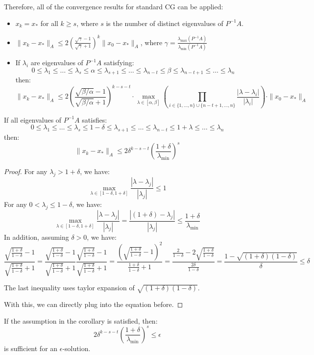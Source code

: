 \documentclass[../main/main.tex]{subfiles}
\begin{document}
                         Therefore, all of the convergence results for standard CG can be applied:
                         \begin{itemize}
            \item $x_{k}=x_{*}$ for all $k \geq  s$, where $s$ is the number of distinct eigenvalues of $P^{-1} A$.
    \item $\|x_{k}-x_{*}\|_{A} \leq  2 \left(\frac{\sqrt{\gamma }-1}{\sqrt{\gamma }+1} \right)^{ k  } \|x_{0}-x_{*}\|_{A}$, where $\gamma  = \frac{\lambda _{\max }(P^{-1} A)}{\lambda _{\min }(P^{-1} A)} $
                           \item If $\lambda _{i}$ are eigenvalues of $P^{-1} A$ satisfying: \[
                                 0 \leq  \lambda _{1} \leq  \ldots  \leq  \lambda _{s} \leq  \alpha  \leq  \lambda _{s+1} \leq  \ldots  \leq  \lambda _{n-t}\leq  \beta  \leq  \lambda _{n-t+1} \leq  \ldots \leq  \lambda _{n}
                                 \]
                                 then: \[
\|x_{k}-x_{*}\|_{A} \leq  2 \left(\frac{\sqrt{\beta  /\alpha }-1}{\sqrt{\beta  / \alpha }+1} \right)^{k-s-t} \cdot \max_{\lambda \in [\alpha,\beta]}\left( \prod_{i \in \{1, \ldots  , n\}\cup \{n-t+1, \ldots  , n\}} \frac{|\lambda -\lambda _{i}|}{|\lambda _{i}|}\right) \cdot \|x_{0}-x_{*}\|_{A}
                                 \]
                         \end{itemize}
\begin{corollary}
  If all eigenvalues of $P^{-1} A$ satisfies: \[
    0 \leq  \lambda _{1} \leq  \ldots  \leq \lambda _{s} \leq 1-\delta  \leq \lambda _{s+1} \leq \ldots \leq \lambda _{n-t}\leq  1+\lambda \leq \ldots \leq \lambda _{n}
  \]
  then: \[
\|x_{k}-x_{*}\|_{A} \leq 2 \delta ^{k-s-t}\left(\frac{1+\delta }{\lambda _{\min }} \right)^{s}
  \]
\end{corollary}
\begin{proof}
  For any $\lambda _{j}> 1+\delta $, we have:
  \[
\max_{\lambda  \in  [1-\delta, 1+\delta]} \frac{|\lambda -\lambda _{j}|}{|\lambda _{j}|} \leq  1
  \]
  For any $0<\lambda _{j}\leq 1-\delta $, we have: \[
\max_{\lambda  \in  [1-\delta, 1+\delta]} \frac{|\lambda -\lambda _{j}|}{|\lambda _{j}|} = \frac{|(1+\delta)-\lambda _{j}|}{|\lambda _{j}|} \leq \frac{1+\delta }{\lambda _{\min }}
  \]
  In addition, assuming $\delta >0$, we have:
  \[
    \frac{\sqrt{\frac{1+\delta }{1-\delta }}-1}{\sqrt{\frac{1+\delta }{1-\delta }}+1} =
    \frac{\sqrt{\frac{1+\delta }{1-\delta }}-1}{\sqrt{\frac{1+\delta }{1-\delta }}+1}
    \frac{\sqrt{\frac{1+\delta }{1-\delta }}-1}{\sqrt{\frac{1+\delta }{1-\delta }}+1} =
    \frac{\left(\sqrt{\frac{1+\delta }{1-\delta }}-1\right)^2}{\frac{1+\delta }{1-\delta }+1}
    = \frac{\frac{2}{1-\delta }-2\sqrt{\frac{1+\delta }{1-\delta  } }}{\frac{2\delta }{1-\delta } }= \frac{1-\sqrt{(1+\delta)(1-\delta)}}{\delta }  \leq\delta
  \]
 \begin{remark}
The last inequality uses taylor expansion of $\sqrt{(1+\delta)(1-\delta)}$.
 \end{remark}
 With this, we can directly plug into the equation before.
\end{proof}

If the assumption in the corollary is satisfied, then: \[
2\delta ^{k-s-t}\left(\frac{1+\delta }{\lambda _{\min }} \right)^{s}\leq  \epsilon
\] is sufficient for an $\epsilon $-solution.
\end{document}
